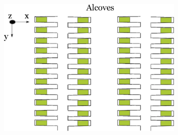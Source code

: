 \begin{frame}
\begin{minipage}{0.49\textwidth}
\begin{figure}[h!]
    \end{figure}
    \begin{figure}[h!]
      \includegraphics[width=0.8\textwidth]{alcoves.eps}
    \end{figure}
  \end{minipage}

\end{frame}
